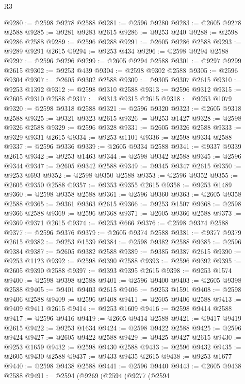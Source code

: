 \begin{lexlean}{R3}
\begin{coremodule}
@9280 := @2598 @9278 @2588
@9281 := @2596 @9280
@9283 := @2605 @9278 @2588
@9285 := @9281 @9283 @2615
@9286 := @9253 @240
@9288 := @2598 @9286 @2588
@9289 := @2596 @9288
@9291 := @2605 @9286 @2588
@9293 := @9289 @9291 @2615
@9294 := @9253 @434
@9296 := @2598 @9294 @2588
@9297 := @2596 @9296
@9299 := @2605 @9294 @2588
@9301 := @9297 @9299 @2615
@9302 := @9253 @439
@9304 := @2598 @9302 @2588
@9305 := @2596 @9304
@9307 := @2605 @9302 @2588
@9309 := @9305 @9307 @2615
@9310 := @9253 @1392
@9312 := @2598 @9310 @2588
@9313 := @2596 @9312
@9315 := @2605 @9310 @2588
@9317 := @9313 @9315 @2615
@9318 := @9253 @1079
@9320 := @2598 @9318 @2588
@9321 := @2596 @9320
@9323 := @2605 @9318 @2588
@9325 := @9321 @9323 @2615
@9326 := @9253 @1427
@9328 := @2598 @9326 @2588
@9329 := @2596 @9328
@9331 := @2605 @9326 @2588
@9333 := @9329 @9331 @2615
@9334 := @9253 @1101
@9336 := @2598 @9334 @2588
@9337 := @2596 @9336
@9339 := @2605 @9334 @2588
@9341 := @9337 @9339 @2615
@9342 := @9253 @1463
@9344 := @2598 @9342 @2588
@9345 := @2596 @9344
@9347 := @2605 @9342 @2588
@9349 := @9345 @9347 @2615
@9350 := @9253 @693
@9352 := @2598 @9350 @2588
@9353 := @2596 @9352
@9355 := @2605 @9350 @2588
@9357 := @9353 @9355 @2615
@9358 := @9253 @1489
@9360 := @2598 @9358 @2588
@9361 := @2596 @9360
@9363 := @2605 @9358 @2588
@9365 := @9361 @9363 @2615
@9366 := @9253 @1507
@9368 := @2598 @9366 @2588
@9369 := @2596 @9368
@9371 := @2605 @9366 @2588
@9373 := @9369 @9371 @2615
@9374 := @9253 @666
@9376 := @2598 @9374 @2588
@9377 := @2596 @9376
@9379 := @2605 @9374 @2588
@9381 := @9377 @9379 @2615
@9382 := @9253 @1539
@9384 := @2598 @9382 @2588
@9385 := @2596 @9384
@9387 := @2605 @9382 @2588
@9389 := @9385 @9387 @2615
@9390 := @9253 @1123
@9392 := @2598 @9390 @2588
@9393 := @2596 @9392
@9395 := @2605 @9390 @2588
@9397 := @9393 @9395 @2615
@9398 := @9253 @1574
@9400 := @2598 @9398 @2588
@9401 := @2596 @9400
@9403 := @2605 @9398 @2588
@9405 := @9401 @9403 @2615
@9406 := @9253 @1591
@9408 := @2598 @9406 @2588
@9409 := @2596 @9408
@9411 := @2605 @9406 @2588
@9413 := @9409 @9411 @2615
@9414 := @9253 @1609
@9416 := @2598 @9414 @2588
@9417 := @2596 @9416
@9419 := @2605 @9414 @2588
@9421 := @9417 @9419 @2615
@9422 := @9253 @1634
@9424 := @2598 @9422 @2588
@9425 := @2596 @9424
@9427 := @2605 @9422 @2588
@9429 := @9425 @9427 @2615
@9430 := @9253 @1659
@9432 := @2598 @9430 @2588
@9433 := @2596 @9432
@9435 := @2605 @9430 @2588
@9437 := @9433 @9435 @2615
@9438 := @9253 @1677
@9440 := @2598 @9438 @2588
@9441 := @2596 @9440
@9443 := @2605 @9438 @2588
@9491 := @2594
    (@9269
      (@2594
        (@9277
          (@2594

\end{coremodule}
\end{lexlean}

